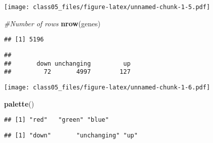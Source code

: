 \documentclass[]{article}
\newenvironment{Shaded}{\begin{snugshade}}{\end{snugshade}}
\newcommand{\KeywordTok}[1]{\textcolor[rgb]{0.13,0.29,0.53}{\textbf{#1}}}
\newcommand{\DataTypeTok}[1]{\textcolor[rgb]{0.13,0.29,0.53}{#1}}
\newcommand{\StringTok}[1]{\textcolor[rgb]{0.31,0.60,0.02}{#1}}
\newcommand{\CommentTok}[1]{\textcolor[rgb]{0.56,0.35,0.01}{\textit{#1}}}
\newcommand{\OperatorTok}[1]{\textcolor[rgb]{0.81,0.36,0.00}{\textbf{#1}}}
\newcommand{\NormalTok}[1]{#1}
\begin{document}
\texttt{[image: class05\_files/figure-latex/unnamed-chunk-1-5.pdf]}

\begin{Shaded}
\begin{Highlighting}[]
\CommentTok{#Number of rows}
\KeywordTok{nrow}\NormalTok{(genes)}
\end{Highlighting}
\end{Shaded}

\begin{verbatim}
## [1] 5196
\end{verbatim}

\begin{Shaded}
\end{Shaded}

\begin{verbatim}
## 
##       down unchanging         up 
##         72       4997        127
\end{verbatim}

\begin{Shaded}
\end{Shaded}

\texttt{[image: class05\_files/figure-latex/unnamed-chunk-1-6.pdf]}

\begin{Shaded}
\begin{Highlighting}[]
\KeywordTok{palette}\NormalTok{()}
\end{Highlighting}
\end{Shaded}

\begin{verbatim}
## [1] "red"   "green" "blue"
\end{verbatim}

\begin{Shaded}
\end{Shaded}

\begin{verbatim}
## [1] "down"       "unchanging" "up"
\end{verbatim}
\end{document}
